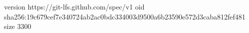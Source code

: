 version https://git-lfs.github.com/spec/v1
oid sha256:19c679cef7e340724ab2ac0bdc334003d9500a6b23590e572d3caba812fef481
size 3300
